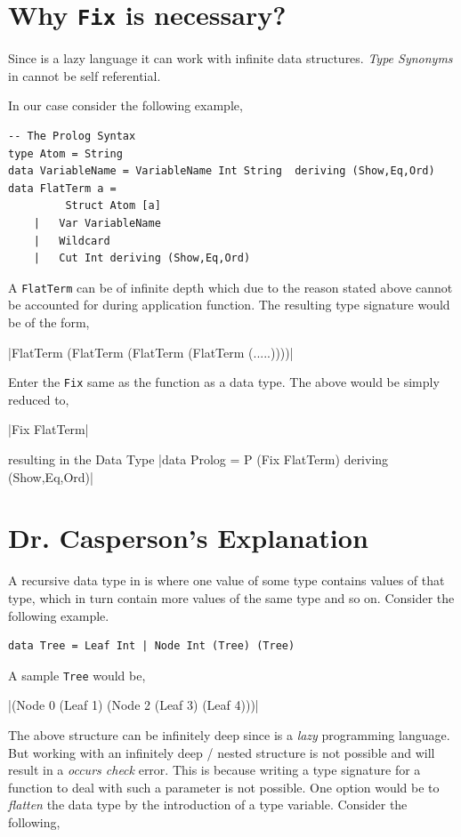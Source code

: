 \documentclass[thesis-solanki.tex]{subfiles}
\begin{document}
\section{Why \texttt{Fix} is necessary?}
Since  is a lazy language it can work with infinite data structures. \textit{Type Synonyms} in  cannot be self 
referential.


 

In our case consider the following example,

\begin{verbatim}
-- The Prolog Syntax
type Atom = String
data VariableName = VariableName Int String  deriving (Show,Eq,Ord)
data FlatTerm a = 
		 Struct Atom [a]
	|	Var VariableName
	|	Wildcard
	|	Cut Int deriving (Show,Eq,Ord)
\end{verbatim} 
 
A \texttt{FlatTerm} can be of infinite depth which due to the reason stated above cannot be accounted for during application function. The resulting type signature would be of the form,

|FlatTerm (FlatTerm (FlatTerm (FlatTerm (.....))))|

Enter the \texttt{Fix} same as the function as a data type. The above would be simply reduced to,

|Fix FlatTerm|   

resulting in the  Data Type
|data Prolog = P (Fix FlatTerm) deriving (Show,Eq,Ord)|

\section{Dr. Casperson's Explanation}

A recursive data type in  is where one value of some type contains values of that type, which in turn contain more values of the same type 
and so on. Consider the following example.

\begin{verbatim}
data Tree = Leaf Int | Node Int (Tree) (Tree)
\end{verbatim} 

A sample \texttt{Tree} would be,

|(Node 0 (Leaf 1) (Node 2 (Leaf 3) (Leaf 4)))|

The above structure can be infinitely deep since  is a \textit{lazy} programming language. But working with an infinitely deep / nested 
structure is not possible and will result in a \textit{occurs check} error. This is because writing a type signature for a function to deal with such a
parameter is not possible. One option would be to \textit{flatten} the data type by the introduction of a type variable. Consider the following,
\end{document}

